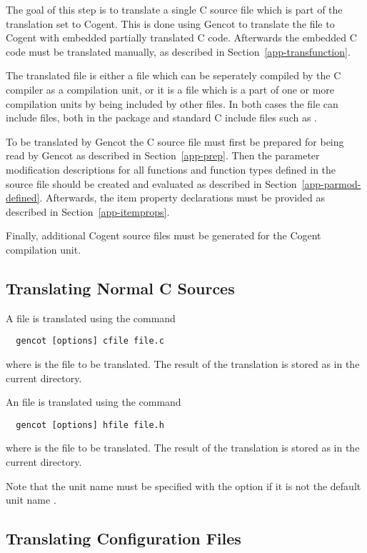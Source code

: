 The goal of this step is to translate a single C source file which is part of the translation set to Cogent.
This is done using Gencot to translate the file to Cogent with embedded partially translated C code.
Afterwards the embedded C code must be translated manually, as described in Section~\ref{app-transfunction}.

The translated file is either a  file which can be seperately compiled by the C compiler as a compilation unit,
or it is a  file which is a part of one or more compilation units by being included by other files. In both cases
the file can include  files, both in the package and standard C include files such as .

To be translated by Gencot the C source file must first be prepared for being read by Gencot as described in
Section~\ref{app-prep}. Then the parameter modification descriptions for all functions and function types defined 
in the source file should be created and evaluated as described in Section~\ref{app-parmod-defined}. Afterwards,
the item property declarations must be provided as described in Section~\ref{app-itemprops}.

Finally, additional Cogent source files must be generated for the Cogent compilation unit.

\subsection{Translating Normal C Sources}
\label{app-transauto-normal}

A  file is translated using the command
\begin{verbatim}
  gencot [options] cfile file.c
\end{verbatim}
where  is the file to be translated. The result of the translation is stored as  
in the current directory.

An  file is translated using the command
\begin{verbatim}
  gencot [options] hfile file.h
\end{verbatim}
where  is the file to be translated. The result of the translation is 
stored as  in the current directory.

Note that the unit name must be specified with the  option if it is not the default unit name .

\subsection{Translating Configuration Files}
\label{app-transauto-config}

